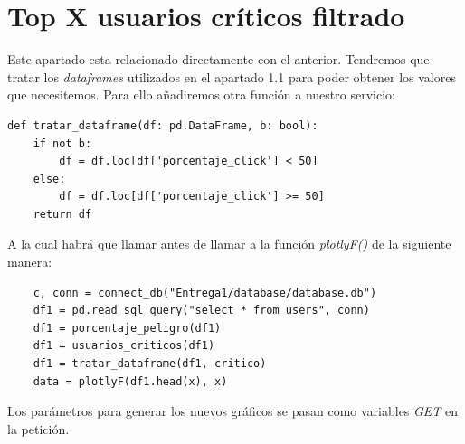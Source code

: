 \documentclass[12pt, a4paper,twoside,titlepage]{article}
\begin{document}
\section{Top X usuarios críticos filtrado}
Este apartado esta relacionado directamente con el anterior. Tendremos que tratar los \emph{dataframes} utilizados en el apartado 1.1 para poder obtener los valores que necesitemos. Para ello añadiremos otra función a nuestro servicio:
\begin{verbatim}
def tratar_dataframe(df: pd.DataFrame, b: bool):
    if not b:
        df = df.loc[df['porcentaje_click'] < 50]
    else:
        df = df.loc[df['porcentaje_click'] >= 50]
    return df
\end{verbatim}
A la cual habrá que llamar antes de llamar a la función \emph{plotlyF()} de la siguiente manera:
\begin{verbatim}
    c, conn = connect_db("Entrega1/database/database.db")
    df1 = pd.read_sql_query("select * from users", conn)
    df1 = porcentaje_peligro(df1)
    df1 = usuarios_criticos(df1)
    df1 = tratar_dataframe(df1, critico)
    data = plotlyF(df1.head(x), x)
\end{verbatim}
Los parámetros para generar los nuevos gráficos se pasan como variables \emph{GET} en la petición.
\end{document}
